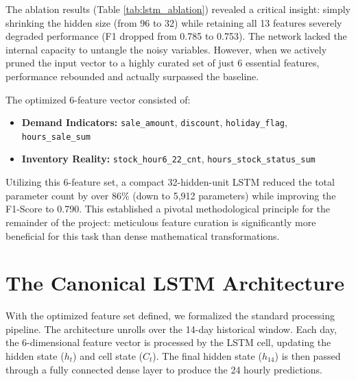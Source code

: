The ablation results (Table \ref{tab:lstm_ablation}) revealed a critical insight: simply shrinking the hidden size (from 96 to 32) while retaining all 13 features severely degraded performance (F1 dropped from 0.785 to 0.753). The network lacked the internal capacity to untangle the noisy variables. However, when we actively pruned the input vector to a highly curated set of just 6 essential features, performance rebounded and actually surpassed the baseline. 

The optimized 6-feature vector consisted of:
\begin{itemize}
    \item \textbf{Demand Indicators:} \texttt{sale\_amount}, \texttt{discount}, \texttt{holiday\_flag}, \texttt{hours\_sale\_sum}
    \item \textbf{Inventory Reality:} \texttt{stock\_hour6\_22\_cnt}, \texttt{hours\_stock\_status\_sum}
\end{itemize}

Utilizing this 6-feature set, a compact 32-hidden-unit LSTM reduced the total parameter count by over 86\% (down to 5,912 parameters) while improving the F1-Score to 0.790. This established a pivotal methodological principle for the remainder of the project: meticulous feature curation is significantly more beneficial for this task than dense mathematical transformations.

\section{The Canonical LSTM Architecture}

With the optimized feature set defined, we formalized the standard processing pipeline. The architecture unrolls over the 14-day historical window. Each day, the 6-dimensional feature vector is processed by the LSTM cell, updating the hidden state ($h_t$) and cell state ($C_t$). The final hidden state ($h_{14}$) is then passed through a fully connected dense layer to produce the 24 hourly predictions.

